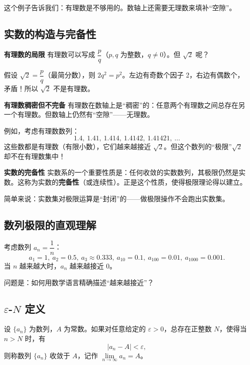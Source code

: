 \documentclass[fontset=fandol]{ctexart}
\newenvironment{custom}[1]{\par\noindent\textbf{#1}\quad}{\par\vspace{0.8em}}
\begin{document}
这个例子告诉我们：有理数是不够用的。数轴上还需要无理数来填补“空隙”。

\subsection{实数的构造与完备性}

\begin{custom}{有理数的局限}
有理数可以写成 \(\dfrac{p}{q}\)（\(p,q\) 为整数，\(q \neq 0\)）。但 \(\sqrt{2}\) 呢？

假设 \(\sqrt{2} = \dfrac{p}{q}\)（最简分数），则 \(2q^2 = p^2\)。左边有奇数个因子 2，右边有偶数个，矛盾！所以 \(\sqrt{2}\) 不是有理数。
\end{custom}

\begin{custom}{有理数稠密但不完备}
有理数在数轴上是“稠密”的：任意两个有理数之间总存在另一个有理数。但数轴上仍然有“空隙”——无理数。

例如，考虑有理数数列：
\[
1.4,\ 1.41,\ 1.414,\ 1.4142,\ 1.41421,\ \dots
\]
这些数都是有理数（有限小数），它们越来越接近 \(\sqrt{2}\)。但这个数列的“极限”\(\sqrt{2}\) 却不在有理数集中！
\end{custom}

\begin{custom}{实数的完备性}
实数系的一个重要性质是：任何收敛的实数数列，其极限仍然是实数。这称为实数的\textbf{完备性}（或连续性）。正是这个性质，使得极限理论得以建立。

简单来说：实数集对极限运算是“封闭”的——做极限操作不会跑出实数集。
\end{custom}

\subsection{数列极限的直观理解}

考虑数列 \(a_n = \dfrac{1}{n}\)：
\[
a_1=1,\ a_2=0.5,\ a_3\approx 0.333,\ a_{10}=0.1,\ a_{100}=0.01,\ a_{1000}=0.001.
\]
当 \(n\) 越来越大时，\(a_n\) 越来越接近 0。

问题是：如何用数学语言精确描述“越来越接近”？

\subsection{\(\varepsilon\)-\(N\) 定义}

\begin{definition}[数列极限]
设 \(\{a_n\}\) 为数列，\(A\) 为常数。如果对任意给定的 \(\varepsilon > 0\)，总存在正整数 \(N\)，使得当 \(n > N\) 时，有
\[
|a_n - A| < \varepsilon,
\]
则称数列 \(\{a_n\}\) 收敛于 \(A\)，记作 \(\lim\limits_{n\to\infty} a_n = A\)。
\end{definition}
\end{document}
